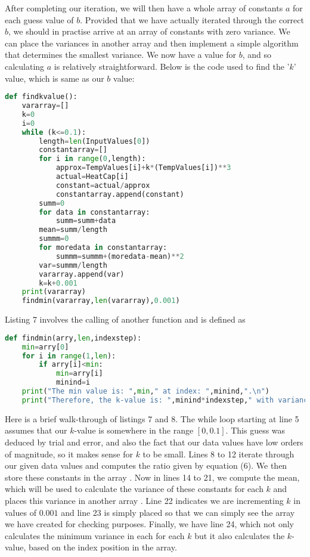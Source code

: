 \documentclass[11pt, oneside]{article}
\begin{document}
\bigskip
\noindent
After completing our iteration, we will then have a whole array of constants $a$ for each guess value of $b$. Provided that we have actually iterated through the correct $b$, we should in practise arrive at an array of constants with zero variance. We can place the variances in another array and then implement a simple algorithm that determines the smallest variance. We now have a value for $b$, and so calculating $a$ is relatively straightforward. Below is the code used to find the '$k$' value, which is same as our $b$ value: 
\begin{lstlisting}[language=Python, caption=Determining the $k$-value in $a(T+kT^3)$]
def findkvalue():
	vararray=[]
	k=0
	i=0
	while (k<=0.1):
		length=len(InputValues[0])
		constantarray=[]
		for i in range(0,length):
			approx=TempValues[i]+k*(TempValues[i])**3
			actual=HeatCap[i]
			constant=actual/approx
			constantarray.append(constant)
		summ=0
		for data in constantarray:
			summ=summ+data
		mean=summ/length
		summm=0
		for moredata in constantarray:
			summm=summm+(moredata-mean)**2
		var=summm/length
		vararray.append(var)
		k=k+0.001
	print(vararray)
	findmin(vararray,len(vararray),0.001)	
\end{lstlisting}
Listing 7 involves the calling of another function  and is defined as
\begin{lstlisting}[language=Python, caption=Definition of findmin(...)]
def findmin(arry,len,indexstep):
	min=arry[0]
	for i in range(1,len):
		if arry[i]<min:
			min=arry[i]
			minind=i
	print("The min value is: ",min," at index: ",minind,".\n")
	print("Therefore, the k-value is: ",minind*indexstep," with variance: ",min,".")
\end{lstlisting}
Here is a brief walk-through of listings 7 and 8. The while loop starting at line 5 assumes that our $k$-value is somewhere in the range $[0,0.1]$. This guess was deduced by trial and error, and also the fact that our data values have low orders of magnitude, so it makes sense for $k$ to be small. Lines 8 to 12 iterate through our given data values and computes the ratio given by equation (6). We then store these constants in the array . Now in lines 14 to 21, we compute the mean, which will be used to calculate the variance of these constants for each $k$ and places this variance in another array . Line 22 indicates we are incrementing $k$ in values of $0.001$ and line 23 is simply placed so that we can simply see the array we have created for checking purposes. Finally, we have line 24, which not only calculates the minimum variance in each  for each $k$ but it also calculates the $k$-value, based on the index position in the array. 
\end{document}
